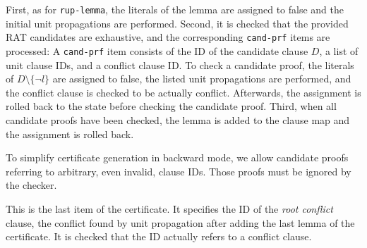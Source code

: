 \documentclass[smallcondensed]{svjour3}     %
\newcommand{\lsti}{\lstinline[language={},literate={}]}
\begin{document}
\begin{description}
      First, as for \lsti{rup-lemma}, the literals of the lemma are assigned to false and the initial unit propagations are performed. 
      Second, it is checked that the provided RAT candidates are exhaustive, and the corresponding \lsti{cand-prf} items are processed:
      A \lsti{cand-prf} item consists of the ID of the candidate clause $D$, a list of unit clause IDs, and a conflict clause ID.
      To check a candidate proof, the literals of $D\setminus\{\neg l\}$ are assigned to false, the listed unit propagations are performed, and the conflict clause is 
      checked to be actually conflict. Afterwards, the assignment is rolled back to the state before checking the candidate proof.
      Third, when all candidate proofs have been checked, the lemma is added to the clause map and the assignment is rolled back.

      To simplify certificate generation in backward mode, we allow candidate proofs referring to arbitrary, even invalid, clause IDs. Those proofs must be ignored by the checker.
    \item[conflict] This is the last item of the certificate. It specifies the ID of the \emph{root conflict} clause, \ie the conflict found by unit propagation after adding the last 
    lemma of the certificate. It is checked that the ID actually refers to a conflict clause.
\end{description}
\end{document}
